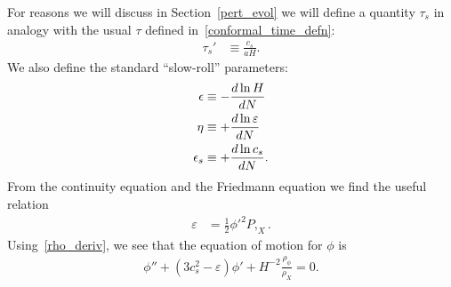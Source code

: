     For reasons we will discuss in Section~\ref{pert_evol} we will
    define a quantity $\tau_s$
    in analogy with the usual $\tau$ defined in~\eqref{conformal_time_defn}:
    \begin{align}\label{tausdef}
        \tau_s'&\equiv\frac{c_s}{aH}.
    \end{align}
We also define the standard ``slow-roll'' parameters:
\begin{align}\label{slowrollparams}
    \epsilon &\equiv -\frac{d\ln H}{dN}	\\
    \eta &\equiv +\frac{d\ln \varepsilon}{dN}\\
    \epsilon_s &\equiv +\frac{d\ln c_s}{dN}.
\end{align}
From the continuity equation and the Friedmann equation
we find the useful relation
\begin{align}\label{epsilon_phi}
    \varepsilon &= \frac{1}{2}{\phi'}^2 P,_{X}.
\end{align}
Using~\eqref{rho_deriv}, we see that
the equation of motion for $\phi$ is~\cite{Hu_2011}
\begin{align}\label{phieom}
    \phi''+(3c_s^2-\varepsilon)\phi'+H^{-2}\frac{\rho_\phi}{\rho_X}=0.
\end{align}


